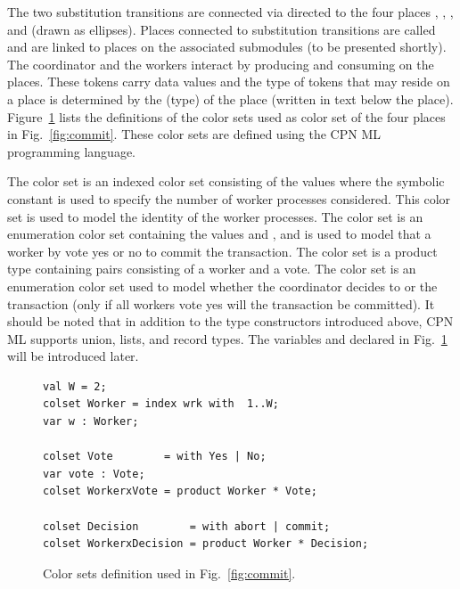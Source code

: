 The two substitution transitions are connected via directed
 to the four places ,
, , and  (drawn
as ellipses). Places connected to substitution transitions are called
 and are linked to  places on the
associated submodules (to be presented shortly). The coordinator and
the workers interact by producing and consuming  on
the places. These tokens carry data values and the type of tokens that
may reside on a place is determined by the  (type)
of the place (written in text below the
place). Figure~\ref{fig:coloursets} lists the definitions of the
color sets used as color set of the four places in
Fig.~\ref{fig:commit}. These color sets are defined using the CPN ML
programming language.

The  color set is an indexed color set consisting of
the values  where the symbolic
constant  is used to specify the number of worker processes
considered. This color set is used to model the identity of the
worker processes. The color set  is an enumeration
color set containing the values  and , and
is used to model that a worker by vote yes or no to commit the
transaction. The color set  is a product type
containing pairs consisting of a worker and a vote. The color set
 is an enumeration color set used to model whether
the coordinator decides to  or  the
transaction (only if all workers vote yes will the transaction be
committed). It should be noted that in addition to the type
constructors introduced above, CPN ML supports union, lists, and
record types. The variables  and  declared in
Fig.~\ref{fig:coloursets} will be introduced later.

\begin{figure}[]
\begin{verbatim}
val W = 2;
colset Worker = index wrk with  1..W;
var w : Worker;

colset Vote        = with Yes | No;
var vote : Vote;
colset WorkerxVote = product Worker * Vote;

colset Decision        = with abort | commit;
colset WorkerxDecision = product Worker * Decision;
\end{verbatim}
\caption{Color sets definition used in Fig.~\ref{fig:commit}.}
\label{fig:coloursets}
\end{figure}


